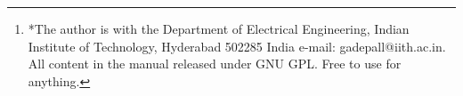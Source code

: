 \documentclass[journal,12pt,twocolumn]{IEEEtran}
\begin{document}
\author{G V V Sharma$^{*}$ %
\thanks{*The author is with the Department
of Electrical Engineering, Indian Institute of Technology, Hyderabad
502285 India e-mail:  gadepall@iith.ac.in. All content in the manual released under GNU GPL.  Free to use for anything.}%
}
% 
%



% 







\maketitle
\end{document}
